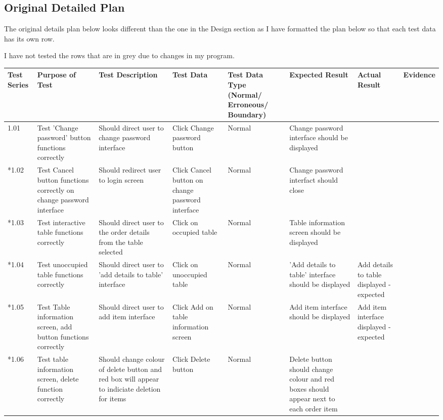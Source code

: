 \begin{landscape}
\subsection{Original Detailed Plan}
The original details plan below looks different than the one in the Design section as I have formatted the plan below so that each test data has its own row.

I have not tested the rows that are in grey due to changes in my program.

\begin{center}
    \begin{longtable}{|p{1.5cm}|p{2.5cm}|p{2.5cm}|p{2cm}|p{2cm}|p{2cm}|p{2cm}|p{2cm}|}
        \hline
        \textbf{Test Series} & \textbf{Purpose of Test} & \textbf{Test Description} & \textbf{Test Data} & \textbf{Test Data Type (Normal/ Erroneous/ Boundary)} & \textbf{Expected Result} & \textbf{Actual Result} & \textbf{Evidence}\\ \hline
        \rowcolor{gray}1.01 & Test 'Change password' button functions correctly & Should direct user to change password interface  & Click Change password button & Normal & Change password interface should be displayed &  &  \\ \hline
         \rowcolor{gray}*1.02 & Test Cancel button functions correctly on change password interface & Should redirect user to login screen  & Click Cancel button on change password interface & Normal & Change password interfact should close &  &  \\ \hline
         \rowcolor{gray}*1.03 & Test interactive table functions correctly & Should direct user to the order details from the table selected  & Click on occupied table & Normal & Table  information screen should be displayed &  &  \\ \hline
        \rowcolor{gray} *1.04 & Test unoccupied table functions correctly & Should direct user to 'add details to table'  interface  & Click on unoccupied table & Normal & 'Add details to table' interface should be displayed & Add details to table displayed - expected &  \\ \hline
        \rowcolor{gray} *1.05 & Test Table information screen, add button functions correctly & Should direct user to add item  interface  & Click Add on table information screen & Normal & Add item interface should be displayed & Add item interface displayed - expected  &  \\ \hline
        \rowcolor{gray} *1.06 & Test table information screen, delete function correctly & Should change colour of delete button and red box will appear to indiciate deletion for items  & Click Delete button & Normal & Delete button should change colour and red boxes should appear next to each order item &  &  \\ \hline

\end{longtable}
\end{center}
\end{landscape}
